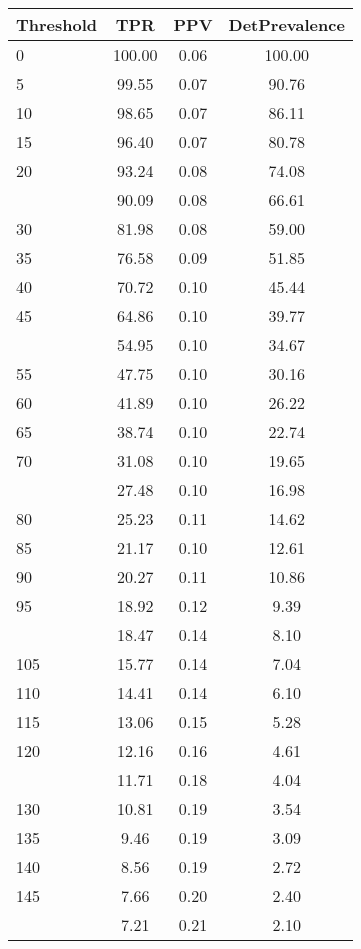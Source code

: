 \begin{table}[ht]
\centering
\begin{tabular}{lccc}
  \toprule
Threshold & TPR & PPV & DetPrevalence \\ 
  \midrule
0 & 100.00 & 0.06 & 100.00 \\ 
  5 & 99.55 & 0.07 & 90.76 \\ 
  10 & 98.65 & 0.07 & 86.11 \\ 
  15 & 96.40 & 0.07 & 80.78 \\ 
  20 & 93.24 & 0.08 & 74.08 \\ 
   \addlinespace
25 & 90.09 & 0.08 & 66.61 \\ 
  30 & 81.98 & 0.08 & 59.00 \\ 
  35 & 76.58 & 0.09 & 51.85 \\ 
  40 & 70.72 & 0.10 & 45.44 \\ 
  45 & 64.86 & 0.10 & 39.77 \\ 
   \addlinespace
50 & 54.95 & 0.10 & 34.67 \\ 
  55 & 47.75 & 0.10 & 30.16 \\ 
  60 & 41.89 & 0.10 & 26.22 \\ 
  65 & 38.74 & 0.10 & 22.74 \\ 
  70 & 31.08 & 0.10 & 19.65 \\ 
   \addlinespace
75 & 27.48 & 0.10 & 16.98 \\ 
  80 & 25.23 & 0.11 & 14.62 \\ 
  85 & 21.17 & 0.10 & 12.61 \\ 
  90 & 20.27 & 0.11 & 10.86 \\ 
  95 & 18.92 & 0.12 & 9.39 \\ 
   \addlinespace
100 & 18.47 & 0.14 & 8.10 \\ 
  105 & 15.77 & 0.14 & 7.04 \\ 
  110 & 14.41 & 0.14 & 6.10 \\ 
  115 & 13.06 & 0.15 & 5.28 \\ 
  120 & 12.16 & 0.16 & 4.61 \\ 
   \addlinespace
125 & 11.71 & 0.18 & 4.04 \\ 
  130 & 10.81 & 0.19 & 3.54 \\ 
  135 & 9.46 & 0.19 & 3.09 \\ 
  140 & 8.56 & 0.19 & 2.72 \\ 
  145 & 7.66 & 0.20 & 2.40 \\ 
   \addlinespace
150 & 7.21 & 0.21 & 2.10 \\ 

\end{tabular}
\end{table}
